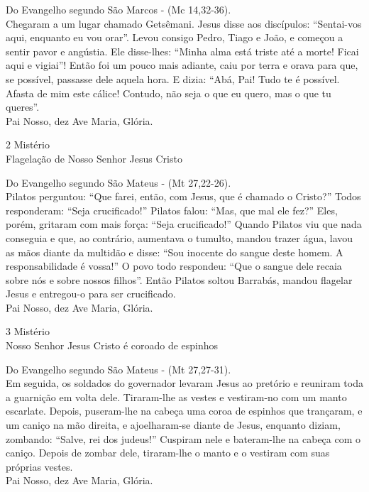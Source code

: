 \begin{flushleft}
    Do Evangelho segundo São Marcos - (\textcolor{VioletRed2}{Mc 14,32-36}). \\
    \hfill{} \break{}
    Chegaram a um lugar chamado Getsêmani. Jesus disse aos discípulos: ``Sentai-vos aqui, enquanto eu vou orar''. Levou consigo Pedro, Tiago e João, e começou a sentir pavor e angústia. Ele disse-lhes: ``Minha alma está triste até a morte! Ficai aqui e vigiai''! Então foi um pouco mais adiante, caiu por terra e orava para que, se possível, passasse dele aquela hora. E dizia: ``Abá, Pai! Tudo te é possível. Afasta de mim este cálice! Contudo, não seja o que eu quero, mas o que tu queres''. \\
    \hfill{} \break{}
    Pai Nosso, dez Ave Maria, Glória.
\end{flushleft}
\begin{center}
    2\textordmasculine{} Mistério \\ Flagelação de Nosso Senhor Jesus Cristo
\end{center}
\begin{flushleft}
    Do Evangelho segundo São Mateus - (\textcolor{VioletRed2}{Mt 27,22-26}). \\
    \hfill{} \break{}
    Pilatos perguntou: ``Que farei, então, com Jesus, que é chamado o Cristo?'' Todos responderam: ``Seja crucificado!'' Pilatos falou: ``Mas, que mal ele fez?'' Eles, porém, gritaram com mais força: ``Seja crucificado!'' Quando Pilatos viu que nada conseguia e que, ao contrário, aumentava o tumulto, mandou trazer água, lavou as mãos diante da multidão e disse: ``Sou inocente do sangue deste homem. A responsabilidade é vossa!'' O povo todo respondeu: ``Que o sangue dele recaia sobre nós e sobre nossos filhos''. Então Pilatos soltou Barrabás, mandou flagelar Jesus e entregou-o para ser crucificado. \\
    \hfill{} \break{}
    Pai Nosso, dez Ave Maria, Glória.
\end{flushleft}
\newpage
\begin{center}
    3\textordmasculine{} Mistério \\ Nosso Senhor Jesus Cristo é coroado de espinhos
\end{center}
\begin{flushleft}
    Do Evangelho segundo São Mateus - (\textcolor{VioletRed2}{Mt 27,27-31}). \\
    \hfill{} \break{}
    Em seguida, os soldados do governador levaram Jesus ao pretório e reuniram toda a guarnição em volta dele. Tiraram-lhe as vestes e vestiram-no com um manto escarlate. Depois, puseram-lhe na cabeça uma coroa de espinhos que trançaram, e um caniço na mão direita, e ajoelharam-se diante de Jesus, enquanto diziam, zombando: ``Salve, rei dos judeus!'' Cuspiram nele e bateram-lhe na cabeça com o caniço. Depois de zombar dele, tiraram-lhe o manto e o vestiram com suas próprias vestes. \\
    \hfill{} \break{}
    Pai Nosso, dez Ave Maria, Glória.
\end{flushleft}
